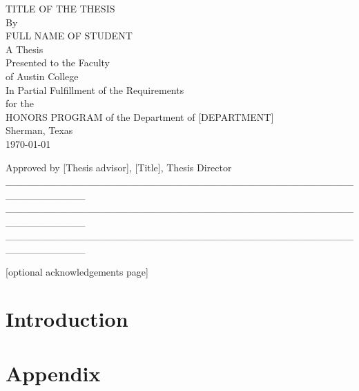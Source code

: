 \documentclass[12pt]{article}
\newcommand\myemptypage{ 
    \null
    \thispagestyle{empty}
    \addtocounter{page}{-1}
    \newpage
    }
\newcommand{\signatureLine}{\_\_\_\_\_\_\_\_\_\_\_\_\_\_\_\_\_\_\_\_\_\_\_\_\_\_\_\_\_\_\_\_\_\_\_\_\_\_\_\_\_\_\_\_\_\_\_\_\_\_\_\_\_\_\_\_\_\_\_}
\theoremstyle{definition}
\begin{document}
\myemptypage{} %


\begin{center}
    \uppercase{Title of the thesis}\\
    By\\
    \uppercase{Full name of Student}\\
    A Thesis\\
    Presented to the Faculty\\
    of Austin College\\
    In Partial Fulfillment of the Requirements \\
    for the\\
    HONORS PROGRAM of the Department of [DEPARTMENT]\\
    Sherman, Texas\\
    \today
\end{center}
\newpage


\begin{center}
    Approved by [Thesis advisor], [Title], Thesis Director 
    \newline
    \signatureLine
    \newline
    \signatureLine
    \newline
    \signatureLine
    \newline
\end{center}
\newpage


\begin{center}
    [optional acknowledgements page]
\end{center}

\newpage
\tableofcontents
\listoffigures %
\listoftables %
\newpage

\section{Introduction}


\newpage


\section{Appendix}

\newpage
\myemptypage{}
\end{document}
